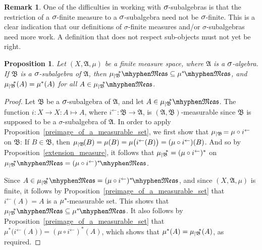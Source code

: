 \documentclass[
twoside=true,
paper=letter,
fontsize=9pt,
pagesize=auto,
leqno,
openany,
headsepline,
overfullrule,
]{scrbook}
\theoremstyle{plain}
\theoremstyle{plain}
\newtheorem{prop}[thm]{Proposition}
\theoremstyle{definition}
\newtheorem{rmk}[thm]{Remark}
\theoremstyle{bfnoteitalic}
\theoremstyle{bfnoteroman}
\newcommand{\sigalg}[1]{\mathfrak{#1}}
\newcommand{\textsigma}{\hbox{\large{$\sigma$}}\kern-1pt}
\newcommand{\restrictedto}[1]{_{\lvert#1}\kern-1.5pt}
\newcommand{\preimage}[1]{#1^{\leftarrow}}
\newcommand{\sigmaalgebra}{\sigalg{A}}
\newcommand{\sigmaalgebraii}{\sigalg{B}}
\newcommand{\measurable}[1]{{#1}\mhyphen\mathfrak{Meas}}
\newcommand{\kernast}{\ast\kern-1pt}
\newcommand{\measuresubstar}[1]{\measure\restrictedto{#1}\kern-2pt^*}
\newcommand{\measurespace}{X}
\newcommand{\measure}{\mu}
\begin{document}
\begin{rmk}
One of the difficulties in working with $\textsigma$\hyp{}subalgebras is that
the restriction of a $\textsigma$\hyp{}finite measure to a $\textsigma$\hyp{}subalgebra need not be 
$\textsigma$\hyp{}finite.  This is a clear indication that our definitions of \textsigma\hyp{}finite measures and/or \textsigma\hyp{}subalgebras need more work. A definition that does not respect sub\hyp{}objects must not yet be right.
\end{rmk}





\begin{prop}\label{measurable_inclusion}
Let $(\measurespace, \sigmaalgebra, \measure)$ be a finite measure space, where $\sigmaalgebra$ is a $\textsigma$-algebra.  If $\sigmaalgebraii$ is a $\textsigma$-subalgebra of $\sigmaalgebra$, then 
$\measurable{\measuresubstar{\sigmaalgebraii}} \subseteq \measurable{\measure^\kernast}$, and
$\measuresubstar{\sigmaalgebraii}(A) = \measure^*(A)$ for all 
$A \in \measurable{\measuresubstar{\sigmaalgebraii}}$.
\end{prop}



\begin{proof}
Let $\sigmaalgebraii$ be a $\textsigma$-subalgebra of $\sigmaalgebra$, and let 
$A\in \measurable{\measuresubstar{\sigmaalgebraii}}$.
The function $i:\measurespace\to\measurespace : A \mapsto A$, where $\preimage{i}:\sigmaalgebraii\to\sigmaalgebra$, is $(\sigmaalgebra, \sigmaalgebraii)$\hyp{}measurable since $\sigmaalgebraii$ is supposed to be a \textsigma-subalgebra of $\sigmaalgebra$.
In order to apply Proposition~\ref{preimage_of_a_measurable_set}, we first show that $\measure\restrictedto{\sigmaalgebraii} = \measure\circ\preimage{i}$ on $\sigmaalgebraii$: If $B\in\sigmaalgebraii$, then 
$\measure\restrictedto{\sigmaalgebraii}(B) 
= \measure(B) 
= \measure\bigl(\preimage{i}(B)\bigr)
= (\measure\circ\preimage{i})(B)$.
And so by Proposition~\ref{extension_measure}, it follows that $\measuresubstar{\sigmaalgebraii}=(\measure\circ\preimage{i})^*$ on 
$\measurable{\measuresubstar{\sigmaalgebraii}} 
= 
\measurable{(\measure\circ\preimage{i})^\kernast}$.


Since $A\in \measurable{\measuresubstar{\sigmaalgebraii}} =\measurable{(\measure\circ\preimage{i})^\kernast}$,
and since $(\measurespace, \sigmaalgebra, \measure)$ is finite,
it follows by Proposition~\ref{preimage_of_a_measurable_set} that 
$\preimage{i}(A) = A$ is a $\measure^\kernast$-measurable set.  This shows that 
$\measurable{\measuresubstar{\sigmaalgebraii}} \subseteq \measurable{\measure^\kernast}$. 
It also follows by Proposition~\ref{preimage_of_a_measurable_set} that 
$\measure^*\bigl(\preimage{i}(A)\bigr) = (\measure\circ\preimage{i})^*(A)$, which shows that $\measure^*(A) = \measuresubstar{\sigmaalgebraii}(A)$, as required.
\end{proof}
\end{document}
